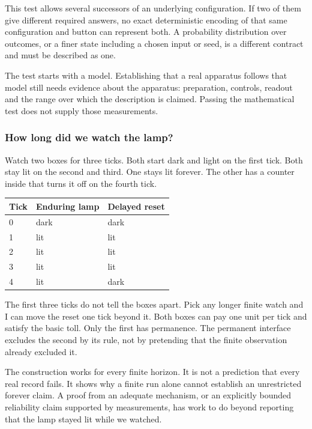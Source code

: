 \documentclass[11pt,twoside]{article}
\theoremstyle{thielethm}
\theoremstyle{thieledef}
\theoremstyle{thieledef}
\theoremstyle{thieledef}
\theoremstyle{thielethm}
\theoremstyle{thieleobs}
\theoremstyle{thielethm}
\begin{document}
This test allows several successors of an underlying configuration. If two of them give different
required answers, no exact deterministic encoding of that same
configuration and button can represent both. 
A probability distribution over outcomes, or a finer state including a
chosen input or seed, is a different contract and must be described as one.

The test starts with a model. Establishing that a real apparatus follows
that model still needs evidence about the apparatus: preparation, controls,
readout and the range over which the description is claimed. Passing the
mathematical test does not supply those measurements.

\subsubsection*{How long did we watch the lamp?}

Watch two boxes for three ticks. Both start dark and light on the first tick.
Both stay lit on the second and third. One stays lit forever. The other
has a counter inside that turns it off on the fourth tick.

\begin{center}
\begin{tabular}{@{}lll@{}}
Tick & Enduring lamp & Delayed reset \\ \hline
0 & dark & dark \\
1 & lit & lit \\
2 & lit & lit \\
3 & lit & lit \\
4 & lit & dark \\ \hline
\end{tabular}
\end{center}

The first three ticks do not tell the boxes apart. Pick any longer finite
watch and I can move the reset one tick beyond it. Both boxes can pay one
unit per tick and satisfy the basic toll. Only the first has permanence.
The permanent interface excludes the second by its rule, not by pretending
that the finite observation already excluded it.

The construction works for every finite horizon. It is not a prediction that every
real record fails. It shows why a finite run alone cannot establish an
unrestricted forever claim. A proof from an adequate mechanism, or an
explicitly bounded reliability claim supported by measurements, has work
to do beyond reporting that the lamp stayed lit while we watched.
\end{document}
